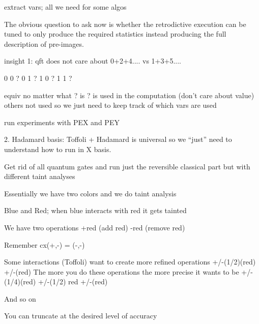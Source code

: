 \documentclass{article}
\begin{document}
\begin{refsection}

extract vars; all we need for some algos

The obvious question to ask now is whether the retrodictive execution
can be tuned to only produce the required statistics instead producing
the full description of pre-images. 

insight 1: qft does not care about 0+2+4.... vs 1+3+5....

0 0 ?
0 1 ?
1 0 ?
1 1 ?

equiv no matter what ? is
? is used in the computation (don't care about value)
others not used
so we just need to keep track of which vars are used

run experiments with PEX and PEY





2. Hadamard basis: Toffoli + Hadamard is universal so we “just” need to understand how to run in X basis. 

   Get rid of all quantum gates and run just the reversible classical part but with different taint analyses

   Essentially we have two colors and we do taint analysis

   Blue and Red; when blue interacts with red it gets tainted

   We have two operations +red (add red) -red (remove red)

   Remember cx(+,-) = (-,-) 

   Some interactions (Toffoli) want to create more refined operations +/-(1/2)(red) +/-(red)
   The more you do these operations the more precise it wants to be +/-(1/4)(red) +/-(1/2) red +/-(red)

   And so on

   You can truncate at the desired level of accuracy


\end{refsection}
\end{document}
